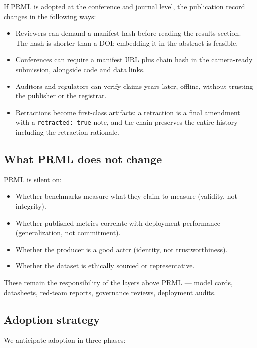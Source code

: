 \documentclass[11pt, a4paper]{article}
\begin{document}
If PRML is adopted at the conference and journal level, the publication record changes in the following ways:

\begin{itemize}[leftmargin=2em, itemsep=0.2em]
  \item Reviewers can demand a manifest hash before reading the results section. The hash is shorter than a DOI; embedding it in the abstract is feasible.
  \item Conferences can require a manifest URL plus chain hash in the camera-ready submission, alongside code and data links.
  \item Auditors and regulators can verify claims years later, offline, without trusting the publisher or the registrar.
  \item Retractions become first-class artifacts: a retraction is a final amendment with a \texttt{retracted: true} note, and the chain preserves the entire history including the retraction rationale.
\end{itemize}

\subsection{What PRML does not change}

PRML is silent on:

\begin{itemize}[leftmargin=2em, itemsep=0.2em]
  \item Whether benchmarks measure what they claim to measure (validity, not integrity).
  \item Whether published metrics correlate with deployment performance (generalization, not commitment).
  \item Whether the producer is a good actor (identity, not trustworthiness).
  \item Whether the dataset is ethically sourced or representative.
\end{itemize}

These remain the responsibility of the layers above PRML --- model cards, datasheets, red-team reports, governance reviews, deployment audits.

\subsection{Adoption strategy}

We anticipate adoption in three phases:
\end{document}
